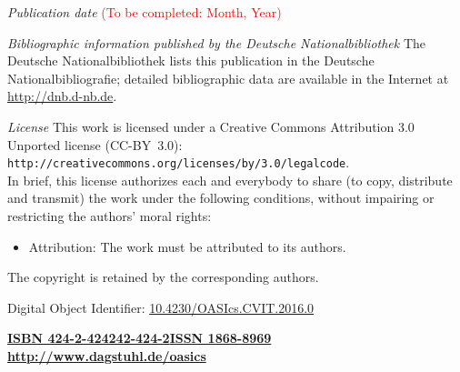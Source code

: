 \documentclass[a4paper,UKenglish]{oasicsmaster-v2016}
\newcommand{\VolumeISBN}{424-2-424242-424-2}
\begin{document}
\begin{publicationinfo}
\bigskip
\emph{Publication date}\newline
\textcolor{red}{(To be completed: Month, Year)}

\bigskip
\bigskip

\emph{Bibliographic information published by the Deutsche Nationalbibliothek}\newline
The Deutsche Nationalbibliothek lists this publication in the Deutsche Nationalbibliografie; detailed bibliographic data are available in the Internet at \href{http://dnb.d-nb.de}{http://dnb.d-nb.de}. 

\bigskip

\emph{License}\newline
This work is licensed under a Creative Commons Attribution 3.0 Unported license (CC-BY~3.0): \texttt{http://creativecommons.org/licenses/by/3.0/legalcode}.\\
In brief, this license authorizes each and everybody to share (to copy, distribute and transmit) the work under the following conditions, without impairing or restricting the authors' moral rights:
\begin{itemize}
\item Attribution: The work must be attributed to its authors.
\end{itemize}

\smallskip

The copyright is retained by the corresponding authors.

\bigskip
\bigskip
\bigskip
\bigskip

Digital Object Identifier: \href{http://dx.doi.org/10.4230/OASIcs.CVIT.2016.0}{10.4230/OASIcs.CVIT.2016.0}

\vfill
\textbf{\href{http://www.dagstuhl.de/dagpub/\VolumeISBN}{ISBN \VolumeISBN}}\qquad \qquad \textbf{\href{http://drops.dagstuhl.de/oasics}{ISSN 1868-8969}}  \hfill \textbf{\href{http://www.dagstuhl.de/oasics}{http://www.dagstuhl.de/oasics}}

  
\newpage

\ \\
\bigskip
\bigskip
\bigskip


\end{publicationinfo}
\end{document}

